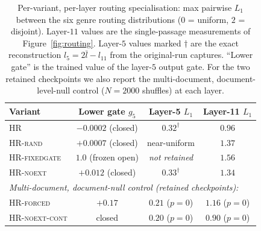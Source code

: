 \begin{table}[h]
\centering
\small
\caption{Per-variant, per-layer routing specialisation: max pairwise $L_1$ between the six genre routing distributions ($0$ = uniform, $2$ = disjoint). Layer-$11$ values are the single-passage measurements of Figure~\ref{fig:routing}. Layer-$5$ values marked $\dagger$ are the exact reconstruction $l_5 = 2\bar l - l_{11}$ from the original-run captures. ``Lower gate'' is the trained value of the layer-$5$ output gate. For the two retained checkpoints we also report the multi-document, document-level-null control ($N=2000$ shuffles) at each layer.}
\label{tab:per-layer}
\begin{tabular}{lccc}
\toprule
Variant & Lower gate $g_5$ & Layer-5 $L_1$ & Layer-11 $L_1$ \\
\midrule
\textsc{HR}            & $-0.0002$ (closed) & $0.32^{\dagger}$ & $0.96$ \\
\textsc{HR-rand}       & $+0.0007$ (closed) & near-uniform     & $1.37$ \\
\textsc{HR-fixedgate}  & $1.0$ (frozen open) & \emph{not retained} & $1.56$ \\
\textsc{HR-noext}      & $+0.012$ (closed)  & $0.33^{\dagger}$ & $1.34$ \\
\midrule
\multicolumn{4}{l}{\emph{Multi-document, document-null control (retained checkpoints):}} \\
\textsc{HR-forced}     & $+0.17$            & $0.21$ ($p{=}0$) & $1.16$ ($p{=}0$) \\
\textsc{HR-noext-cont} & closed             & $0.20$ ($p{=}0$) & $0.90$ ($p{=}0$) \\
\bottomrule
\end{tabular}
\end{table}

